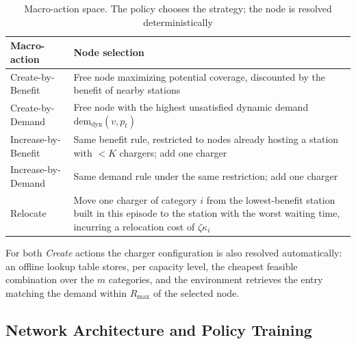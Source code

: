 \documentclass[graybox]{svmult}
\begin{document}
\begin{table}[!htbp]
\caption{Macro-action space. The policy chooses the strategy; the node is resolved deterministically}
\label{tab:actions}
\centering
\footnotesize
\begin{tabular}{@{}p{2.9cm}p{7.6cm}@{}}
\toprule
Macro-action & Node selection \\
\midrule
Create-by-Benefit & Free node maximizing potential coverage, discounted by the benefit of nearby stations \\
Create-by-Demand & Free node with the highest unsatisfied dynamic demand $\mathrm{dem}_{\mathrm{dyn}}(v,p_t)$ \\
Increase-by-Benefit & Same benefit rule, restricted to nodes already hosting a station with $<K$ chargers; add one charger \\
Increase-by-Demand & Same demand rule under the same restriction; add one charger \\
Relocate & Move one charger of category $i$ from the lowest-benefit station built in this episode to the station with the worst waiting time, incurring a relocation cost of $\zeta\kappa_i$ \\
\bottomrule
\end{tabular}
\end{table}

For both \emph{Create} actions the charger configuration is also resolved automatically: an offline lookup table stores, per capacity level, the cheapest feasible combination over the $m$ categories, and the environment retrieves the entry matching the demand within $R_{\max}$ of the selected node.

\subsection{Network Architecture and Policy Training}
\label{subsec:training}
\end{document}

